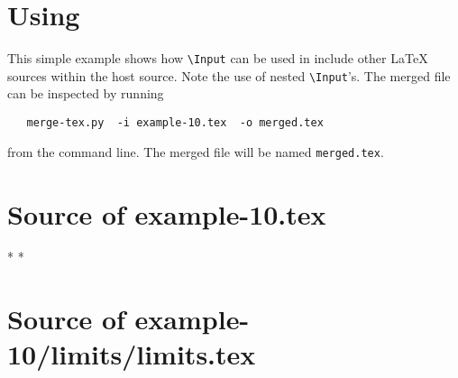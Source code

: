 \documentclass[12pt]{pylatex}
\begin{document}
\section*{Using {\copy\SlashInput}}


This simple example shows how {\tt\small\verb|\Input|} can be used in include other LaTeX sources within
the host source. Note the use of nested {\tt\small\verb|\Input|}'s. The merged file can be inspected by running

\begin{lstlisting}
   merge-tex.py  -i example-10.tex  -o merged.tex
\end{lstlisting}

from the command line. The merged file will be named {\tt\small merged.tex}.



\vspace{-5pt}

\section*{Source of example-10.tex}

\bgroup
{}
\latexstyle
\begin{latex}
*   
*   
\end{latex}
\egroup

\vspace{10pt}

\section*{Source of example-10/limits/limits.tex}
\end{document}
